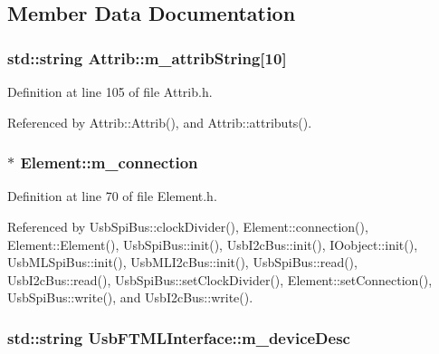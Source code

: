 \subsection{Member Data Documentation}
\hypertarget{classAttrib_a3414521d7a82476e874b25a5407b5e63}{
\subsubsection[{m\_\-attribString}]{\setlength{\rightskip}{0pt plus 5cm}std::string {\bf Attrib::m\_\-attribString}\mbox{[}10\mbox{]}}}
\label{classAttrib_a3414521d7a82476e874b25a5407b5e63}


Definition at line 105 of file Attrib.h.

Referenced by Attrib::Attrib(), and Attrib::attributs().\hypertarget{classElement_abe3de7a5dbbc9a6dd2d7e012e5fdb266}{
\subsubsection[{m\_\-connection}]{$\ast$ {\bf Element::m\_\-connection}}}
\label{classElement_abe3de7a5dbbc9a6dd2d7e012e5fdb266}


Definition at line 70 of file Element.h.

Referenced by UsbSpiBus::clockDivider(), Element::connection(), Element::Element(), UsbSpiBus::init(), UsbI2cBus::init(), IOobject::init(), UsbMLSpiBus::init(), UsbMLI2cBus::init(), UsbSpiBus::read(), UsbI2cBus::read(), UsbSpiBus::setClockDivider(), Element::setConnection(), UsbSpiBus::write(), and UsbI2cBus::write().\hypertarget{classUsbFTMLInterface_a15063a6d03335ec8988e41eb61a1ab9f}{
\subsubsection[{m\_\-deviceDesc}]{\setlength{\rightskip}{0pt plus 5cm}std::string {\bf UsbFTMLInterface::m\_\-deviceDesc}}}
\label{classUsbFTMLInterface_a15063a6d03335ec8988e41eb61a1ab9f}


